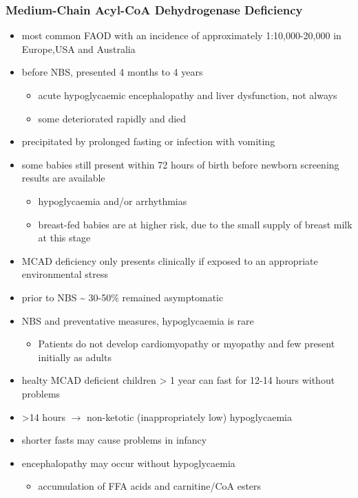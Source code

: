 \documentclass{scrartcl}
\begin{document}
\subsubsection{Medium-Chain Acyl-CoA Dehydrogenase Deficiency}
\label{sec:orgd98c70d}
\begin{itemize}
\item most common FAOD with an incidence of approximately 1:10,000-20,000
in Europe,USA and Australia
\item before NBS, presented 4 months to 4 years
\begin{itemize}
\item acute hypoglycaemic encephalopathy and liver dysfunction, not always
\item some deteriorated rapidly and died
\end{itemize}
\item precipitated by prolonged fasting or infection with vomiting
\item some babies still present within 72 hours of birth before
newborn screening results are available
\begin{itemize}
\item hypoglycaemia and/or arrhythmias
\item breast-fed babies are at higher risk, due to the small supply of
breast milk at this stage
\end{itemize}
\item MCAD deficiency only presents clinically if exposed to an
appropriate environmental stress
\item prior to NBS \textasciitilde{} 30-50\% remained asymptomatic
\item NBS and preventative measures, hypoglycaemia is rare
\begin{itemize}
\item Patients do not develop cardiomyopathy or myopathy and few present
initially as adults
\end{itemize}
\item healty MCAD deficient children > 1 year can fast for 12-14 hours without problems
\item >14 hours \(\to\) non-ketotic (inappropriately low) hypoglycaemia
\item shorter fasts may cause problems in infancy
\item encephalopathy may occur without hypoglycaemia
\begin{itemize}
\item accumulation of FFA acids and carnitine/CoA esters
\end{itemize}
\end{itemize}
\end{document}
